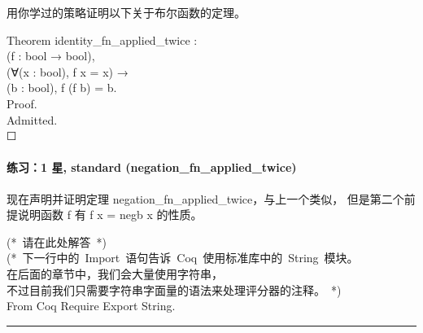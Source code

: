 \documentclass[utf8]{ctexart}
\let\oldparagraph\paragraph
\renewcommand{\paragraph}[1]{\oldparagraph{#1}\mbox{}}
\begin{document}
用你学过的策略证明以下关于布尔函数的定理。

{Theorem} {identity\_fn\_applied\_twice} :\\
\hspace*{0.333em}\hspace*{0.333em}{∀}({f} : {bool} → {bool}),\\
\hspace*{0.333em}\hspace*{0.333em}({∀}({x} : {bool}), {f} {x} = {x}) →\\
\hspace*{0.333em}\hspace*{0.333em}{∀}({b} : {bool}), {f} ({f} {b}) =
{b}.\\
{Proof}.\\
\hspace*{0.333em}\hspace*{0.333em}{(*~请在此处解答~*)} {Admitted}.\\

{☐}

\protect\hypertarget{lab45}{}{}

\hypertarget{ux7ec3ux4e601-ux661f-standard-negation_fn_applied_twice}{%
\paragraph{练习：1 星, standard
(negation\_fn\_applied\_twice)}\label{ux7ec3ux4e601-ux661f-standard-negation_fn_applied_twice}}

现在声明并证明定理 {{negation\_fn\_applied\_twice}}，与上一个类似，
但是第二个前提说明函数 {{f}} 有 {{f}} {{x}} {=} {{negb}} {{x}} 的性质。

{(*~请在此处解答~*)}\\
{(*~下一行中的~{{Import}}~语句告诉~Coq~使用标准库中的~{{String}}~模块。\\
\hspace*{0.333em}\hspace*{0.333em}\hspace*{0.333em}在后面的章节中，我们会大量使用字符串，\\
\hspace*{0.333em}\hspace*{0.333em}\hspace*{0.333em}不过目前我们只需要字符串字面量的语法来处理评分器的注释。~*)}\\
{From} {Coq} {Require} {Export} {String}.\\

\begin{center}\rule{0.5\linewidth}{\linethickness}\end{center}
\end{document}
